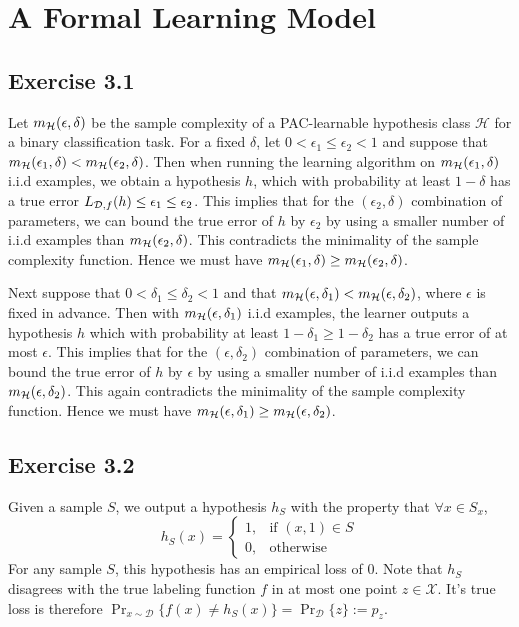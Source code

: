 \chapter{A Formal Learning Model}

\section*{Exercise 3.1}

Let $m_{\mathcal{H}}(\epsilon, \delta)$ be the sample complexity of a PAC-learnable hypothesis class 
$\mathcal{H}$ for a binary classification task. For a fixed $\delta$, let 
$0 < \epsilon_1 \leq \epsilon_2 < 1$ and suppose that 
$m_{\mathcal{H}}(\epsilon_1, \delta) < m_{\mathcal{H}}(\epsilon_2, \delta)$. Then when 
running the learning algorithm on $m_{\mathcal{H}}(\epsilon_1, \delta)$ i.i.d examples, 
we obtain a hypothesis $h$, which with probability at least $1 - \delta$ has 
a true error $L_{\mathcal{D}, f}(h) \leq \epsilon_1 \leq \epsilon_2$. This
implies that for the $(\epsilon_2, \delta)$ combination of parameters, we can bound 
the true error of $h$ by $\epsilon_2$ by using a smaller number of i.i.d examples 
than $m_{\mathcal{H}}(\epsilon_2, \delta)$. This contradicts
the minimality of the sample complexity function. Hence we must have 
$m_{\mathcal{H}}(\epsilon_1, \delta) \geq m_{\mathcal{H}}(\epsilon_2, \delta)$.

Next suppose that $0 < \delta_1 \leq \delta_2 < 1$ and that 
$m_{\mathcal{H}}(\epsilon, \delta_1) < m_{\mathcal{H}}(\epsilon, \delta_2)$, where $\epsilon$
is fixed in advance. Then with $m_{\mathcal{H}}(\epsilon, \delta_1)$ i.i.d examples, the
learner outputs a hypothesis $h$ which with probability at least 
$1 - \delta_1 \geq 1 - \delta_2$ has a true error of at most $\epsilon$. This
implies that for the $(\epsilon, \delta_2)$ combination of parameters, we can bound 
the true error of $h$ by $\epsilon$ by using a smaller number of i.i.d examples 
than $m_{\mathcal{H}}(\epsilon, \delta_2)$. This again contradicts
the minimality of the sample complexity function. Hence we must have 
$m_{\mathcal{H}}(\epsilon, \delta_1) \geq m_{\mathcal{H}}(\epsilon, \delta_2)$.

\section*{Exercise 3.2}

Given a sample $S$, we output a hypothesis $h_S$ with the property that 
$\forall x \in S_x$, 
\[
    h_S(x) = \left \{ \begin{array}{rl} 
                            1, & \text{if $(x, 1) \in S$} \\
                            0, & \text{otherwise}
                      \end{array} \right .
\]
For any sample $S$, this hypothesis has an empirical loss of $0$. Note 
that $h_S$ disagrees with the true labeling function $f$ in at most one point 
$z \in \mathcal{X}$. It's true loss is therefore 
$\Pr_{x \sim \mathcal{D}} \{ f(x) \neq h_S(x)\} = \Pr_{\mathcal{D}} \{z\} := p_z$. 

